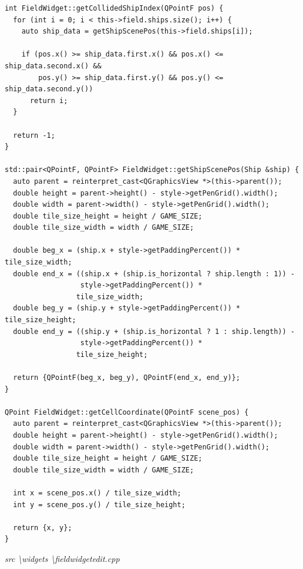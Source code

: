 \documentclass[a4paper,14pt]{extarticle}
\begin{document}
\begin{verbatim}
int FieldWidget::getCollidedShipIndex(QPointF pos) {
  for (int i = 0; i < this->field.ships.size(); i++) {
    auto ship_data = getShipScenePos(this->field.ships[i]);

    if (pos.x() >= ship_data.first.x() && pos.x() <= ship_data.second.x() &&
        pos.y() >= ship_data.first.y() && pos.y() <= ship_data.second.y())
      return i;
  }

  return -1;
}

std::pair<QPointF, QPointF> FieldWidget::getShipScenePos(Ship &ship) {
  auto parent = reinterpret_cast<QGraphicsView *>(this->parent());
  double height = parent->height() - style->getPenGrid().width();
  double width = parent->width() - style->getPenGrid().width();
  double tile_size_height = height / GAME_SIZE;
  double tile_size_width = width / GAME_SIZE;

  double beg_x = (ship.x + style->getPaddingPercent()) * tile_size_width;
  double end_x = ((ship.x + (ship.is_horizontal ? ship.length : 1)) -
                  style->getPaddingPercent()) *
                 tile_size_width;
  double beg_y = (ship.y + style->getPaddingPercent()) * tile_size_height;
  double end_y = ((ship.y + (ship.is_horizontal ? 1 : ship.length)) -
                  style->getPaddingPercent()) *
                 tile_size_height;

  return {QPointF(beg_x, beg_y), QPointF(end_x, end_y)};
}

QPoint FieldWidget::getCellCoordinate(QPointF scene_pos) {
  auto parent = reinterpret_cast<QGraphicsView *>(this->parent());
  double height = parent->height() - style->getPenGrid().width();
  double width = parent->width() - style->getPenGrid().width();
  double tile_size_height = height / GAME_SIZE;
  double tile_size_width = width / GAME_SIZE;

  int x = scene_pos.x() / tile_size_width;
  int y = scene_pos.y() / tile_size_height;

  return {x, y};
}

\end{verbatim}
\textit{src \textbackslash widgets \textbackslash fieldwidgetedit.cpp}
\end{document}
